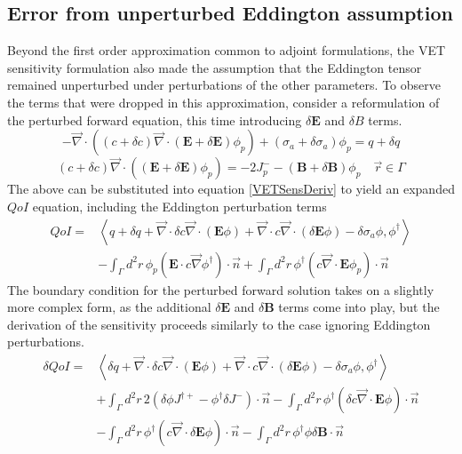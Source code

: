 \documentclass{article}
\newcommand{\vr}{\vec{r}}
\newcommand{\bra}{\left\langle}
\newcommand{\ket}{\right\rangle}
\newcommand{\vdiv}{\vec{\nabla} \cdot}
\newcommand{\vgrad}{\vec{\nabla}}
\newcommand{\Edd}{\mathbf{E}}
\newcommand{\BEdd}{\mathbf{B}}
\newcommand{\siga}{\sigma_a}
\newcommand{\isigt}{c}
\newcommand{\scalSource}{q}
\newcommand{\qoi}{QoI}
\begin{document}
\subsection{Error from unperturbed Eddington assumption}
Beyond the first order approximation common to adjoint formulations, the VET sensitivity formulation also made the assumption that the Eddington tensor remained unperturbed under perturbations of the other parameters. To observe the terms that were dropped in this approximation, consider a reformulation of the perturbed forward equation, this time introducing $\delta \Edd$ and $\delta  B$ terms. 
\begin{equation}
\label{VEFPerEdd}
- \vdiv \left((\isigt + \delta \isigt)\vdiv (\Edd + \delta \Edd) \phi_p \right) + (\siga + \delta \siga)\phi_p = \scalSource + \delta \scalSource
\end{equation}
\begin{equation}
(\isigt + \delta \isigt) \vec{\nabla} \cdot \left((\Edd + \delta \Edd) \phi_p \right)  = - 2J_p^- - (\BEdd +\delta \BEdd) \phi_p \quad \vr \in \Gamma
\end{equation}
The above can be substituted into equation \ref{VETSensDeriv} to yield an expanded $\qoi$ equation, including the Eddington perturbation terms
\begin{equation}
\label{QoIVETAdjNoBCEdd}
\begin{split}
\qoi =& \bra \scalSource + \delta \scalSource + \vdiv \delta \isigt \vdiv \left( \Edd \phi \right) + \vdiv \isigt \vdiv \left( \delta \Edd \phi \right) - \delta \siga \phi, \phi^\dag \ket \\
&- \int_\Gamma d^2 r \, \phi_p \left( \Edd \cdot \isigt \vgrad \phi^\dag \right) \cdot \vec{n} 
+ \int_\Gamma d^2 r \, \phi^\dag \left(  \isigt \vdiv \Edd \phi_p \right) \cdot \vec{n} 
\end{split}
\end{equation}
The boundary condition for the perturbed forward solution takes on a slightly more complex form, as the additional $\delta \Edd$ and $\delta \BEdd$ terms come into play, but the derivation of the sensitivity proceeds similarly to the case ignoring Eddington perturbations.
\begin{equation}
\label{QoIVETAdjEdd}
\begin{split}
\delta \qoi =& \bra \delta \scalSource + \vdiv \delta \isigt \vdiv \left( \Edd \phi \right) + \vdiv \isigt \vdiv \left( \delta \Edd \phi \right) - \delta \siga \phi, \phi^\dag \ket \\
&+ \int_\Gamma d^2 r \, 2  \left( \delta \phi J^{\dag +}  - \phi^\dag \delta J^- \right) \cdot \vec{n}
- \int_\Gamma d^2 r \,  \phi^\dag \left( \delta \isigt \vdiv \Edd \phi \right) \cdot \vec{n}
\\
&- \int_\Gamma d^2 r \,  \phi^\dag \left( \isigt \vdiv \delta \Edd \phi \right) \cdot \vec{n}
- \int_\Gamma d^2 r \,  \phi^\dag \phi \delta \BEdd \cdot \vec{n}
\end{split}
\end{equation} 
\end{document}
